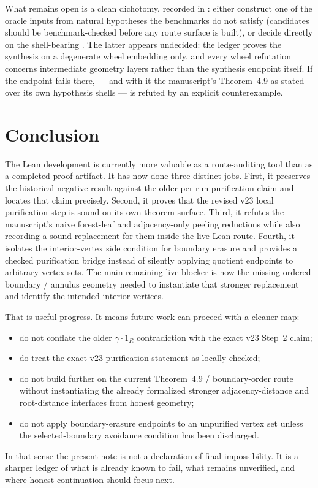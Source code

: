 \documentclass[11pt]{article}
\begin{document}
What remains open is a clean dichotomy, recorded in : either
construct one of the oracle inputs from natural hypotheses the benchmarks do
not satisfy (candidates should be benchmark-checked before any route surface
is built), or decide  directly on the
shell-bearing .  The latter appears
undecided: the ledger proves the synthesis on a degenerate wheel embedding
only, and every wheel refutation concerns intermediate geometry layers rather
than the synthesis endpoint itself.  If the endpoint fails there,
 --- and with it the manuscript's Theorem~4.9 as
stated over its own hypothesis shells --- is refuted by an explicit
counterexample.

\section{Conclusion}

The Lean development is currently more valuable as a route-auditing tool than as
a completed proof artifact.  It has now done three distinct jobs.  First, it
preserves the historical negative result against the older per-run purification
claim and locates that claim precisely.  Second, it proves that the revised v23
local purification step is sound on its own theorem surface.  Third, it refutes
the manuscript's naive forest-leaf and adjacency-only peeling reductions while
also recording a sound replacement for them inside the live Lean route.  Fourth,
it isolates the interior-vertex side condition for boundary erasure and provides
a checked purification bridge instead of silently applying quotient endpoints to
arbitrary vertex sets.  The main remaining live blocker is now the missing
ordered boundary / annulus geometry needed to instantiate that stronger
replacement and identify the intended interior vertices.

That is useful progress.  It means future work can proceed with a cleaner map:
\begin{itemize}[leftmargin=2em]
\item do not conflate the older \(\gamma \cdot 1_R\) contradiction with the
exact v23 Step~2 claim;
\item do treat the exact v23 purification statement as locally checked;
\item do not build further on the current Theorem~4.9 / boundary-order route
without instantiating the already formalized stronger adjacency-distance and
root-distance interfaces from honest geometry;
\item do not apply boundary-erasure endpoints to an unpurified vertex set unless
the selected-boundary avoidance condition has been discharged.
\end{itemize}

In that sense the present note is not a declaration of final impossibility.  It
is a sharper ledger of what is already known to fail, what remains unverified,
and where honest continuation should focus next.
\end{document}
